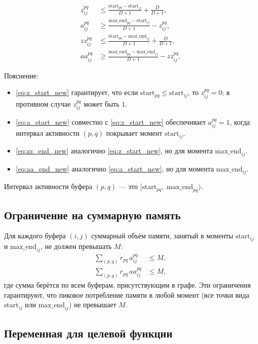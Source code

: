 \begin{align}
	z_{ij}^{pq} &\le \frac{\text{start}_{pq} - \text{start}_{ij}}{D+1} + \frac{D}{D+1}, \label{eq:z_start_new}\\
	a_{ij}^{pq} &\ge \frac{\text{max\_end}_{pq} - \text{start}_{ij}}{D+1} - z_{ij}^{pq}, \label{eq:a_start_new}\\
	zz_{ij}^{pq} &\le \frac{\text{start}_{pq} - \text{max\_end}_{ij}}{D+1} + \frac{D}{D+1}, \label{eq:zz_end_new}\\
	aa_{ij}^{pq} &\ge \frac{\text{max\_end}_{pq} - \text{max\_end}_{ij}}{D+1} - zz_{ij}^{pq}. \label{eq:aa_end_new}
\end{align}

Пояснение:
\begin{itemize}
	\item \eqref{eq:z_start_new} гарантирует, что если $\text{start}_{pq} \le \text{start}_{ij}$, то $z_{ij}^{pq}=0$; в противном случае $z_{ij}^{pq}$ может быть $1$.
	\item \eqref{eq:a_start_new} совместно с \eqref{eq:z_start_new} обеспечивает $a_{ij}^{pq}=1$, когда интервал активности $(p,q)$ покрывает момент $\text{start}_{ij}$.
	\item \eqref{eq:zz_end_new} аналогично \eqref{eq:z_start_new}, но для момента $\text{max\_end}_{ij}$.
	\item \eqref{eq:aa_end_new} аналогично \eqref{eq:a_start_new}, но для момента $\text{max\_end}_{ij}$.
\end{itemize}
Интервал активности буфера $(p,q)$ — это $[\text{start}_{pq},\; \text{max\_end}_{pq})$.

\subsection*{Ограничение на суммарную память}

Для каждого буфера $(i,j)$ суммарный объём памяти, занятый в моменты $\text{start}_{ij}$ и $\text{max\_end}_{ij}$, не должен превышать $M$:
\begin{align}
	\sum_{(p,q)} r_{pq}\, a_{ij}^{pq} &\le M, \label{eq:mem_start}\\
	\sum_{(p,q)} r_{pq}\, aa_{ij}^{pq} &\le M, \label{eq:mem_end}
\end{align}
где сумма берётся по всем буферам, присутствующим в графе. Эти ограничения гарантируют, что пиковое потребление памяти в любой момент (все точки вида $\text{start}_{ij}$ или $\text{max\_end}_{ij}$) не превышает $M$.

\subsection*{Переменная для целевой функции}

